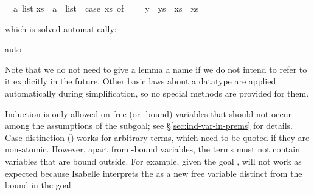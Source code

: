 \begin{isabellebody}
\begin{isamarkuptxt}
\begin{isabelle}
\ {}{}\ {}a\ list{}\isanewline
{}xs\ {}\ a\ {}\ list\ {}\ {}case\ xs\ of\ {}{}\ {}\ {}{}\ {}\ y\ {}\ ys\ {}\ xs{}\ {}\ xs%
\end{isabelle}
which is solved automatically:%
\end{isamarkuptxt}%
\isamarkuptrue%
\isamarkupfalse%
{}auto{}%
\endisatagproof
{\isafoldproof}%
%
\isadelimproof
%
\endisadelimproof
%
\begin{isamarkuptext}%
Note that we do not need to give a lemma a name if we do not intend to refer
to it explicitly in the future.
Other basic laws about a datatype are applied automatically during
simplification, so no special methods are provided for them.

\begin{warn}
  Induction is only allowed on free (or \isasymAnd-bound) variables that
  should not occur among the assumptions of the subgoal; see
  \S\ref{sec:ind-var-in-prems} for details. Case distinction
  () works for arbitrary terms, which need to be
  quoted if they are non-atomic. However, apart from -bound
  variables, the terms must not contain variables that are bound outside.
  For example, given the goal ,
   will not work as expected because Isabelle interprets
  the  as a new free variable distinct from the bound
   in the goal.
\end{warn}%
\end{isamarkuptext}%
\isamarkuptrue%
%
\isadelimtheory
%
\endisadelimtheory
%
\isatagtheory
%
\endisatagtheory
{\isafoldtheory}%
%
\isadelimtheory
%
\endisadelimtheory
\end{isabellebody}%
